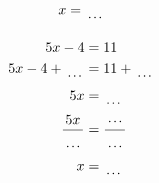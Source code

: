 \documentclass[12pt]{article}
\newcounter{minipagecount}
\begin{document}
\begin{multicols}{2}
\begin{minipage}[t]{0.45\textwidth}
\begin{align*}
        x &= \dotuline{\hspace{5mm}}\\
    \end{align*}
\end{minipage} %
\noindent{(\theminipagecount)}\hspace{0.1mm} %
\begin{minipage}[t]{0.45\textwidth} %
    \vspace{-26pt}  %
    \raggedright %
    \begin{align*} %
        5x - 4 &= 11\\
        5x - 4 + \dotuline{\hspace{5mm}} &= 11 + \dotuline{\hspace{5mm}}\\
        5x &= \dotuline{\hspace{5mm}}\\
        \frac{5x}{\dotuline{\hspace{5mm}}} &= \frac{\dotuline{\hspace{5mm}}}{\dotuline{\hspace{5mm}}}\\
        x &= \dotuline{\hspace{5mm}}\\
    \end{align*}
\end{minipage}\newpage
\noindent{(\theminipagecount)}\hspace{0.1mm} %
\begin{minipage}[t]{0.45\textwidth} %
    \vspace{-26pt}  %

\end{minipage}
\end{multicols}
\end{document}
